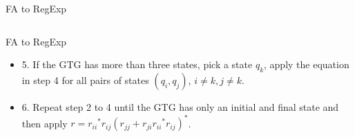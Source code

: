 \documentclass[10pt]{beamer}
\begin{document}
\begin{frame}{FA to RegExp}
\begin{enumerate}[4.]
\begin{columns}
\begin{center}
                  \end{center}
              \end{columns}
    \end{enumerate}
\end{frame}

\begin{frame}[t]{FA to RegExp}
    \begin{itemize}
        \item[] 5. If the GTG has more than three states, pick a state $q_k$, apply the equation in step 4 for all pairs of states $(q_i,q_j)$, $i\neq k, j\neq k$.
        \item[] 6. Repeat step 2 to 4 until the GTG has only an initial and final state and then apply $r = {{r_{ii}}^*}r_{ij}(r_{jj} + r_{ji}{{r_{ii}}^*}r_{ij})^*$.
    \end{itemize}
\end{frame}
\end{document}
